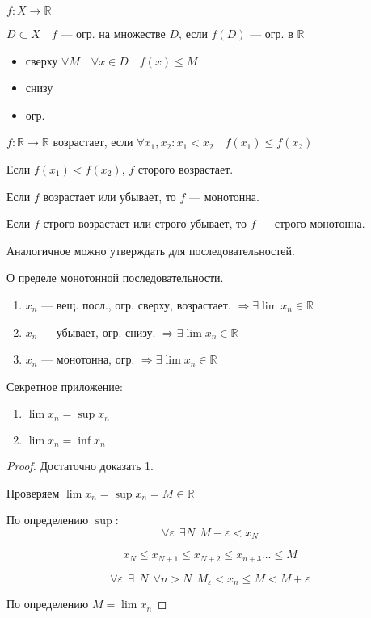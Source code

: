 \begin{definition}
    $f:X\to \mathbb{R}$

    $D\subset X \quad f$ --- огр. на множестве $D$, если $f(D)$ --- огр. в $\mathbb{R}$
    \begin{itemize}
        \itemsep0em
        \item сверху $\forall M \quad \forall x\in D \quad f(x)\leq M$
        \item снизу
        \item огр.
    \end{itemize}
\end{definition}

\begin{definition}
    $f:\mathbb{R}\to \mathbb{R}$ возрастает, если $\forall x_1, x_2: x_1<x_2 \quad f(x_1)\leq f(x_2)$

    Если $f(x_1)<f(x_2)$, $f$ сторого возрастает.

    Если $f$ возрастает или убывает, то $f$ --- монотонна.

    Если $f$ строго возрастает или строго убывает, то $f$ --- строго монотонна.

    Аналогичное можно утверждать для последовательностей.
\end{definition}

\begin{theorem}
    О пределе монотонной последовательности.
    \begin{enumerate}
        \item $x_n$ --- вещ. посл., огр. сверху, возрастает. $\Rightarrow \exists\lim x_n\in\mathbb{R}$
        \item $x_n$ --- убывает, огр. снизу. $\Rightarrow \exists \lim x_n\in\mathbb{R}$
        \item $x_n$ --- монотонна, огр. $\Rightarrow \exists \lim x_n\in\mathbb{R}$
    \end{enumerate}

    Секретное приложение:
    \begin{enumerate}
        \item $\lim x_n=\sup x_n$
        \item $\lim x_n=\inf x_n$
    \end{enumerate}
\end{theorem}

\begin{proof}
    Достаточно доказать 1.

    Проверяем $\lim x_n=\sup x_n=M\in\mathbb{R}$

    По определению $\sup$: $$\forall \varepsilon \ \ \exists N \ \ M-\varepsilon<x_N$$

    $$x_N\leq x_{N+1}\leq x_{N+2}\leq x_{n+3}\ldots \leq M$$

    $$\forall \varepsilon \ \ \exists \ \ N \ \ \forall n>N \ \ M_\varepsilon<x_n\leq M<M+\varepsilon$$

    По определению $M=\lim x_n$
\end{proof}

